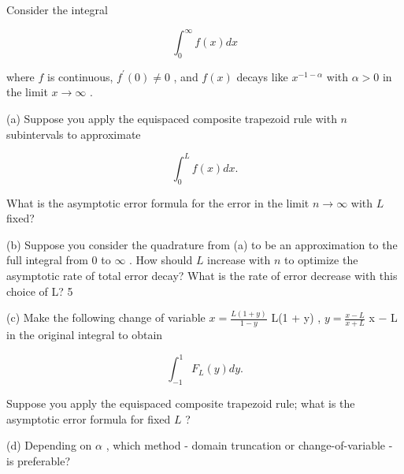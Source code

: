 \begin{exercise}
\label{applied:2024:2}
Consider the integral

\[
\int_ {0} ^ {\infty} f (x) d x
\]

where $f$ is continuous, $f ^ { \prime } ( 0 ) \neq 0$ , and $f ( x )$ decays like $x ^ { - 1 - \alpha }$ with $\alpha > 0$ in the limit $x \to \infty$ .

(a) Suppose you apply the equispaced composite trapezoid rule with $n$ subintervals to approximate

\[
\int_ {0} ^ {L} f (x) d x.
\]

What is the asymptotic error formula for the error in the limit $n\to  \infty$ with $L$ fixed?

(b) Suppose you consider the quadrature from (a) to be an approximation to the full integral from 0 to $\infty$ . How should $L$ increase with $n$ to optimize the asymptotic rate of total error decay? What is the rate of error decrease with this choice of L? 5

(c) Make the following change of variable $x = { \frac { L ( 1 + y ) } { 1 - y } }$ L(1 + y) , $y = { \frac { x - L } { x + L } }$ x − L in the original integral to obtain

\[
\int_ {- 1} ^ {1} F _ {L} (y) d y.
\]

Suppose you apply the equispaced composite trapezoid rule; what is the asymptotic error formula for fixed $L$ ?

(d) Depending on $\alpha$ , which method - domain truncation or change-of-variable - is preferable?
\end{exercise}

